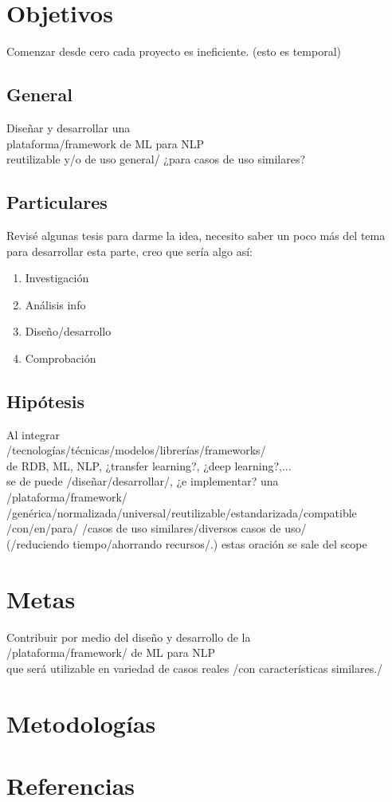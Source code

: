 \documentclass[letterpaper]{article}
\begin{document}
\section {Objetivos}
Comenzar desde cero cada proyecto es ineficiente. (esto es temporal)
\subsection {General}
Diseñar y desarrollar una\\
plataforma/framework de ML para NLP\\
reutilizable y/o de uso general/ ¿para casos de uso similares?
\subsection {Particulares}
Revisé algunas tesis para darme la idea, necesito saber un poco más del tema para desarrollar esta parte, creo que sería algo así:
\begin{enumerate}
    \item Investigación
    \item Análisis info
    \item Diseño/desarrollo
    \item Comprobación
\end{enumerate}
\subsection {Hipótesis}
Al integrar\\
/tecnologías/técnicas/modelos/librerías/frameworks/\\
de RDB, ML, NLP, ¿transfer learning?, ¿deep learning?,...\\
se de puede /diseñar/desarrollar/, ¿e implementar? una\\
/plataforma/framework/\\
/genérica/normalizada/universal/reutilizable/estandarizada/compatible\\
/con/en/para/ /casos de uso similares/diversos casos de uso/\\
(/reduciendo tiempo/ahorrando recursos/.) estas oración se sale del scope

\section {Metas}
Contribuir por medio del diseño y desarrollo de la\\
/plataforma/framework/ de ML para NLP\\
que será utilizable en variedad de casos reales /con características similares./
\section {Metodologías}
\newpage
\section {Referencias}
\printbibliography[heading=none]
\end{document}
